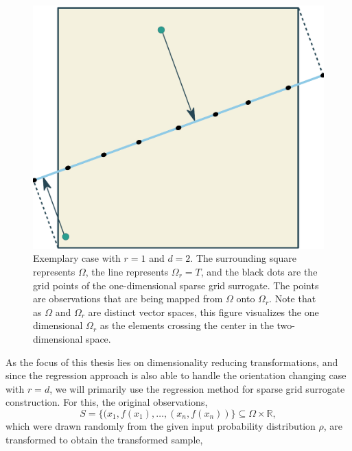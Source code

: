 \documentclass[
  a4paper,  %
  twoside,  %
  bibliography=totoc,
  headsepline,
  cleardoublepage=empty,
  parskip=half,
  draft=false
]{scrbook}
\begin{document}
\begin{mdframed}[style=style]
\begin{figure}[H]
        \centering
\begin{minipage}{.5\textwidth}
        \centering
  \caption{Exemplary case with $r=1$ and $d=2$.
  The surrounding \beige square represents $\Omega$, the \lightblue line represents $\Omega_r=T$, and the black dots are the grid points of the one-dimensional sparse grid surrogate.
The \green points are observations that are being mapped from $\Omega$ onto $\Omega_r$.
Note that as $\Omega$ and $\Omega_r$ are distinct vector spaces, this figure visualizes the one dimensional $\Omega_r$ as the elements crossing the center in the two-dimensional space.}
\label{fig:reduced_grid}
    \end{minipage}%
    \begin{minipage}{0.5\textwidth}
        \centering
   \includegraphics[width=0.85\linewidth]{graphics/reduced_grid}
    \end{minipage}
\end{figure}
\end{mdframed}
%
As the focus of this thesis lies on dimensionality reducing transformations, and since the regression approach is also able to handle the orientation changing case with $r=d$, we will primarily use the regression method for sparse grid surrogate construction.
For this, the original observations,
\begin{equation}
S =\{(x_1, f(x_1), \dots, (x_n, f(x_n))\} \subseteq \Omega \times \mathds{R},
\end{equation}
which were drawn randomly from the given input probability distribution $\rho$, are transformed to obtain the transformed sample,
\end{document}
